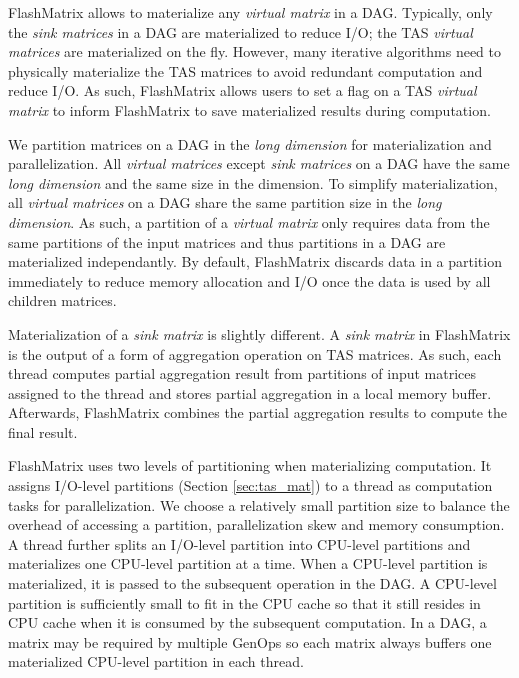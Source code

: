 FlashMatrix allows to materialize any \textit{virtual matrix} in a DAG.
Typically, only the \textit{sink matrices} in a DAG are materialized to reduce
I/O; the TAS \textit{virtual matrices} are materialized on the fly. However,
many iterative algorithms need to physically materialize the TAS matrices
to avoid redundant computation and reduce I/O. As such,
FlashMatrix allows users to set a flag on a TAS \textit{virtual matrix} to
inform FlashMatrix to save materialized results during computation.

We partition matrices on a DAG in the \textit{long dimension} for materialization
and parallelization. All \textit{virtual matrices} except \textit{sink matrices}
on a DAG have the same \textit{long dimension} and the same size in the dimension.
To simplify materialization, all \textit{virtual matrices} on a DAG share
the same partition size in the \textit{long dimension}. As such, a partition
of a \textit{virtual matrix} only requires data from the same partitions of
the input matrices and thus partitions in a DAG are materialized independantly.
By default, FlashMatrix
discards data in a partition immediately to reduce memory allocation and I/O
once the data is used by all children matrices.

Materialization of a \textit{sink matrix} is slightly different.
A \textit{sink matrix} in FlashMatrix is the output of a form of aggregation
operation on TAS matrices. As such, each thread computes partial aggregation
result from partitions of input matrices assigned to the thread and stores partial
aggregation in a local memory buffer. Afterwards, FlashMatrix combines
the partial aggregation results to compute the final result.


FlashMatrix uses two levels of partitioning when materializing computation.
It assigns I/O-level partitions (Section \ref{sec:tas_mat}) to a thread as
computation tasks for parallelization. We choose a relatively small partition
size to balance the overhead of accessing a partition, parallelization skew
and memory consumption. A thread further splits an I/O-level partition into
CPU-level partitions and materializes one CPU-level partition at a time.
When a CPU-level partition is materialized, it is passed to the subsequent
operation in the DAG. A CPU-level partition is sufficiently small to fit in
the CPU cache so that it still resides in CPU cache when it is consumed by
the subsequent computation. In a DAG, a matrix may be required by multiple
GenOps so each matrix always buffers one materialized CPU-level partition in
each thread. 

